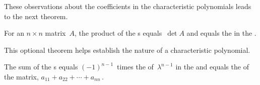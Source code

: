 These observations about the coefficients in the characteristic polynomials leads to the next theorem.

\begin{theorem} \label{thm:charpolyc}
For an \(n\times n\) matrix~\(A\), the product of the s equals~\(\det A\) and equals the  in the .  
\begin{aside}
This optional theorem helps establish the nature of a characteristic polynomial.
\end{aside}
The sum of the s equals \((-1)^{n-1}\)~times the  of~\(\lambda^{n-1}\) in the  and equals the  of the matrix, \(a_{11}+a_{22}+\cdots+a_{nn}\)\,.
\end{theorem}


